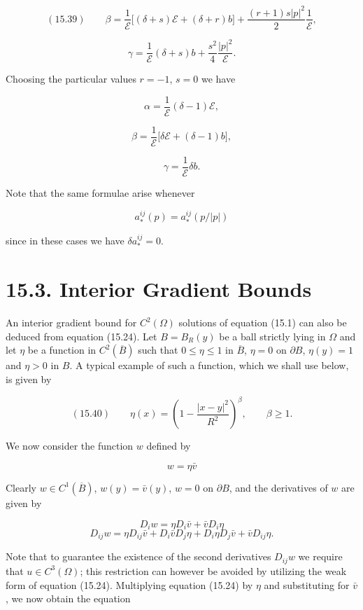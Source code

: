 \[
(15.39)\qquad \beta=\frac{1}{\mathscr{E}}\bigl[(\delta+s)\mathscr{E}+(\delta+r)b\bigr]+\frac{(r+1)s|p|^{2}}{2}\frac{1}{\mathscr{E}},
\]

\[
\gamma=\frac{1}{\mathscr{E}}(\delta+s)b+\frac{s^{2}}{4}\frac{|p|^{2}}{\mathscr{E}}.
\]

Choosing the particular values $r=-1$, $s=0$ we have

\[
\alpha=\frac{1}{\mathscr{E}}(\delta-1)\mathscr{E},
\]

\[
\beta=\frac{1}{\mathscr{E}}\bigl[\delta\mathscr{E}+(\delta-1)b\bigr],
\]

\[
\gamma=\frac{1}{\mathscr{E}}\delta b.
\]


Note that the same formulae arise whenever

\[
a_{*}^{ij}(p)=a_{*}^{ij}(p/|p|)
\]

since in these cases we have $\delta a_{*}^{ij}=0$.

\bigskip

\section*{15.3. Interior Gradient Bounds}

An interior gradient bound for $C^{2}(\Omega)$ solutions of equation (15.1) can also be deduced from equation (15.24). Let $B=B_{R}(y)$ be a ball strictly lying in $\Omega$ and let $\eta$ be a function in $C^{2}(\overline{B})$ such that $0 \le \eta \le 1$ in $\overline{B}$, $\eta=0$ on $\partial B$, $\eta(y)=1$ and $\eta>0$ in $B$. A typical example of such a function, which we shall use below, is given by

\[
(15.40)\qquad \eta(x)=\left(1-\frac{|x-y|^{2}}{R^{2}}\right)^{\beta},\qquad \beta \ge 1.
\]

We now consider the function $w$ defined by

\[
w=\eta \bar{v}
\]

Clearly $w \in C^{1}(\overline{B})$, $w(y)=\bar{v}(y)$, $w=0$ on $\partial B$, and the derivatives of $w$ are given by

\[
D_{i}w=\eta D_{i}\bar{v}+\bar{v}D_{i}\eta
\]
\[
D_{ij}w=\eta D_{ij}\bar{v}+D_{i}\bar{v}D_{j}\eta+D_{i}\eta D_{j}\bar{v}+\bar{v}D_{ij}\eta.
\]

Note that to guarantee the existence of the second derivatives $D_{ij}w$ we require that $u \in C^{3}(\Omega)$; this restriction can however be avoided by utilizing the weak form of equation (15.24). Multiplying equation (15.24) by $\eta$ and substituting for $\bar{v}$, we now obtain the equation

